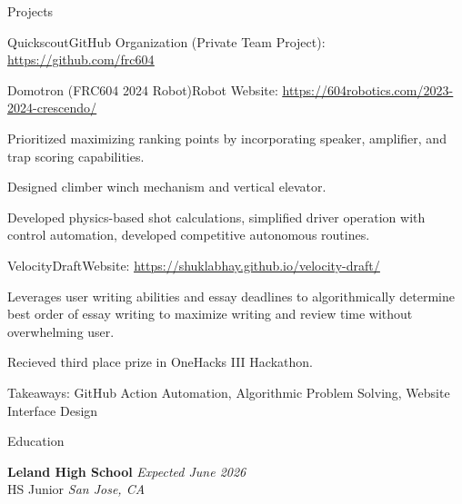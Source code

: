 \documentclass[
  11pt, %
]{public/resume/resume} %
\begin{document}
\begin{rSection}{Projects}
\begin{rSubsection}{Quickscout}{}{GitHub Organization (Private Team Project): \underline{\href{https://github.com/frc604}{https://github.com/frc604}}}{}
  \end{rSubsection}
      
  \begin{rSubsection}{Domotron (FRC604 2024 Robot)}{}{Robot Website: \underline{\href{https://604robotics.com/2023-2024-crescendo/}{https://604robotics.com/2023-2024-crescendo/}}}{}
       
    \item Prioritized maximizing ranking points by incorporating speaker, amplifier, and trap scoring capabilities.
        
    \item Designed climber winch mechanism and vertical elevator.
        
    \item Developed physics-based shot calculations, simplified driver operation with control automation, developed competitive autonomous routines.
        
  \end{rSubsection}
      
  \begin{rSubsection}{VelocityDraft}{}{Website: \underline{\href{https://shuklabhay.github.io/velocity-draft/}{https://shuklabhay.github.io/velocity-draft/}}}{}
       
    \item Leverages user writing abilities and essay deadlines to algorithmically determine best order of essay writing to maximize writing and review time without overwhelming user.
        
    \item Recieved third place prize in OneHacks III Hackathon.
        
    \item Takeaways: GitHub Action Automation, Algorithmic Problem Solving, Website Interface Design
        
  \end{rSubsection}
      
	
\end{rSection}
    

\begin{rSection}{Education}
	
	\textbf{Leland High School} \hfill \textit{Expected June 2026} \\
	HS Junior \hfill \textit{San Jose, CA}
	
\end{rSection}
\end{document}
